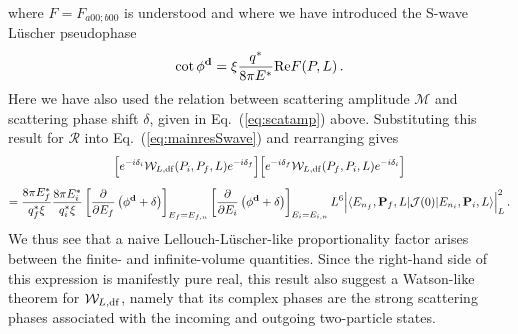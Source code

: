 where $F = F_{a00;b00}$ is understood and where we have introduced the S-wave L\"uscher pseudophase
 \begin{equation}
 \cot \phi^{\textbf d} = \xi \frac{q^*}{8 \pi E^*} \mathrm{Re}F(P,L) \,.
 \end{equation}
Here we have also used the relation between scattering amplitude $\mathcal M$ and scattering phase shift $\delta$, given in Eq.~(\ref{eq:scatamp}) above. Substituting this result for $\mathcal R$ into Eq.~(\ref{eq:mainresSwave}) and rearranging gives
 \begin{multline}
 \label{eq:swaveWtoFV}
\Big [ e^{-i \delta_i}
{\mathcal{W}}_{L,{\rm df}}(P_i,P_f,L) e^{- i \delta_f} \Big ] \Big [ e^{- i \delta_f}  {\mathcal{W}}_{L,{\rm df}}(P_f,P_i,L) e^{- i \delta_i} \Big ]
\\[5pt] = \frac{8 \pi E^*_f}{q^*_f \xi} \frac{8 \pi E^*_i}{q^*_i \xi}  \left [  \frac{\partial}{\partial E_f} \left( \phi^\textbf{d} + \delta \right ) \right ]_{E_f=E_{f,n}} \left [  \frac{\partial}{\partial E_i} \left( \phi^\textbf{d} + \delta \right ) \right ]_{E_i=E_{i,n}} L^6 \Big | \langle E_{n_f}, \textbf P_f, L \vert  \mathcal J(0)  \vert E_{n_i}, \textbf P_i, L \rangle \Big |^2_L 
 \,.
\end{multline}
We thus see that a naive Lellouch-L\"uscher-like proportionality factor arises between the finite- and infinite-volume quantities. Since the right-hand side of this expression is manifestly pure real, this result also suggest a Watson-like theorem for ${\mathcal{W}}_{L,{\rm df}}$, namely that its complex phases are the strong scattering phases associated with the incoming and outgoing two-particle states. 

